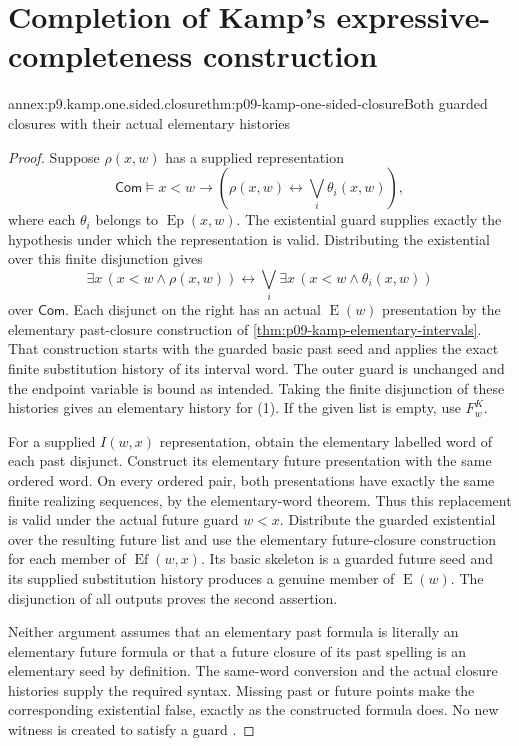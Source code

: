 
\section{Completion of Kamp's expressive-completeness construction}
\label{sec:annex-p09-kamp-iii2-completion}

\begin{annexitem}{annex:p9.kamp.one.sided.closure}{thm:p09-kamp-one-sided-closure}{Both guarded closures with their actual elementary histories}
\begin{proof}
Suppose \(\rho(x,w)\) has a supplied representation
\[
 \mathsf{Com}\models x<w\to
                  (\rho(x,w)\longleftrightarrow\bigvee_i\theta_i(x,w)),
\]
where each \(\theta_i\) belongs to \(\operatorname{Ep}(x,w)\).
The existential guard supplies exactly the hypothesis under which the
representation is valid. Distributing the existential over this finite
disjunction gives
\[
 \exists x\,(x<w\land\rho(x,w))
       \longleftrightarrow\bigvee_i\exists x\,(x<w\land\theta_i(x,w))
 \tag{1}
\]
over \(\mathsf{Com}\). Each disjunct on the right has an
actual \(\operatorname{E}(w)\) presentation by the elementary
past-closure construction of
\cref{thm:p09-kamp-elementary-intervals}. That construction starts
with the guarded basic past seed and applies the exact finite
substitution history of its interval word. The outer guard is unchanged
and the endpoint variable is bound as intended. Taking the finite
disjunction of these histories gives an elementary history for (1).
If the given list is empty, use \(F^K_w\).

For a supplied \(I(w,x)\) representation, obtain the elementary
labelled word of each past disjunct. Construct its elementary future
presentation with the same ordered word. On every ordered pair, both
presentations have exactly the same finite realizing sequences, by
the elementary-word theorem. Thus this replacement is valid under
the actual future guard \(w<x\). Distribute the guarded
existential over the resulting future list and use the elementary
future-closure construction for each member of \(\operatorname{Ef}(w,x)\).
Its basic skeleton is a guarded future seed and its supplied
substitution history produces a genuine member of \(\operatorname{E}(w)\).
The disjunction of all outputs proves the second assertion.

Neither argument assumes that an elementary past formula is literally
an elementary future formula or that a future closure of its past
spelling is an elementary seed by definition. The same-word conversion
and the actual closure histories supply the required syntax.
Missing past or future points make the corresponding existential
false, exactly as the constructed formula does. No new witness is
created to satisfy a guard \cite[ch.~III, pp.~67--68, 93--94]{Kamp1968}.
\end{proof}
\end{annexitem}

